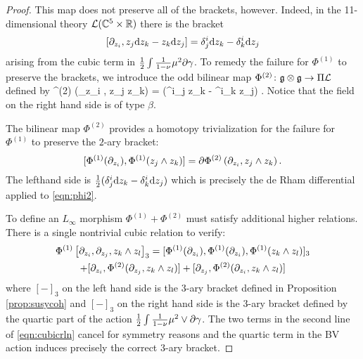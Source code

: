 \begin{proof}
This map does not preserve all of the brackets, however. 
Indeed, in the 11-dimensional theory $\mathcal L(\mathbb C^5 \times \mathbb R)$ there is the bracket 
\[
\left[\partial_{z_i}, z_j {\rm d} z_k - z_k {\rm d} z_j\right] = \delta^i_j {\rm d} z_k - \delta^i_k {\rm d} z_j 
\]
arising from the cubic term in $\frac12 \int \frac{1}{1-\nu} \mu^2 \partial \gamma$. 
To remedy the failure for $\Phi^{(1)}$ to preserve the brackets, we introduce the odd bilinear map $\Phi^{(2)} \colon \mathfrak g \otimes \mathfrak g \to \Pi \mathcal L$ defined by 
\beqn\label{eqn:phi2}
\Phi^{(2)} \left(\partial_{z_i} , z_j \wedge z_k\right) =  (\delta^i_j z_k - \delta^i_k z_j) .
\eeqn
Notice that the field on the right hand side is of type $\beta$. 

The bilinear map $\Phi^{(2)}$ provides a homotopy trivialization for the failure for $\Phi^{(1)}$ to preserve the $2$-ary bracket: 
\[
[\Phi^{(1)} (\partial_{z_i}) , \Phi^{(1)}(z_j \wedge z_k)] = \partial \Phi^{(2)}\left(\partial_{z_i} , z_j \wedge z_k\right).
\]
The lefthand side is $\frac12 (\delta_j^i {\rm d} z_k - \delta_k^i {\rm d} z_j)$ which is precisely the de Rham differential applied to \eqref{eqn:phi2}.

To define an $L_\infty$ morphism $\Phi^{(1)} + \Phi^{(2)}$ must satisfy additional higher relations. 
There is a single nontrivial cubic relation to verify:
\begin{multline} \label{eqn:cubicrln}
\Phi^{(1)}\left[\partial_{z_i}, \partial_{z_j}, z_k \wedge z_l\right]_3 = [\Phi^{(1)}(\partial_{z_i}), \Phi^{(1)}(\partial_{z_i}), \Phi^{(1)}(z_k \wedge z_l)]_3 \\ + [\partial_{z_i}, \Phi^{(2)}(\partial_{z_j}, z_k \wedge z_l)] + [\partial_{z_j}, \Phi^{(2)}(\partial_{z_i}, z_k \wedge z_l)]
\end{multline}
where $[-]_3$ on the left hand side is the $3$-ary bracket defined in Proposition \ref{prop:susycoh} and $[-]_3$ on the right hand side is the $3$-ary bracket defined by the quartic part of the action $\frac12 \int \frac{1}{1-\nu} \mu^2 \vee \partial \gamma$. 
The two terms in the second line of \eqref{eqn:cubicrln} cancel for symmetry reasons and the quartic term in the BV action induces precisely the correct $3$-ary bracket. 

\end{proof}

